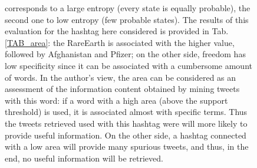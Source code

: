 \documentclass[12pt,%
               a4paper,%
               oneside,openany,%
               titlepage,%
               headinclude,footinclude,%
               BCOR5mm,%
               cleardoublepage=empty,%
               tablecaptionabove,%
               floatperchapter,
               ]{scrreprt}                 %
\begin{document}
\begin{figure}[ht]
\begin{minipage}[b]{0.5\linewidth}
corresponds to a large entropy (every state is equally probable), the second one to low entropy (few probable states). The results of this evaluation for the hashtag here considered is provided in Tab. \ref{TAB_area}: the RareEarth is associated with the higher value, followed by Afghanistan and Pfizer; on the other side, freedom has low specificity since it can be associated with a cumbersome amount of words. In the author's view, the area can be considered as an assessment of the information content obtained by mining tweets with this word: if a word with a high area (above the support threshold) is used, it is associated almost with specific terms. Thus the tweets retrieved used with this hashtag were will more likely to provide useful information. On the other side, a hashtag connected with a low area will provide many spurious tweets, and thus, in the end, no useful information will be retrieved.



\end{minipage}
\end{figure}
\end{document}
